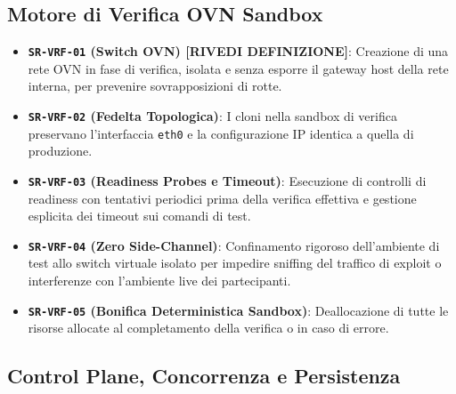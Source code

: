 \subsection{Motore di Verifica OVN
Sandbox}\label{motore-di-verifica-ovn-sandbox}

\begin{itemize}
\tightlist
\item
  \textbf{\passthrough{\lstinline!SR-VRF-01!} (Switch OVN) {[}RIVEDI
  DEFINIZIONE{]}}: Creazione di una rete OVN in fase di verifica,
  isolata e senza esporre il gateway host della rete interna, per
  prevenire sovrapposizioni di rotte.
\item
  \textbf{\passthrough{\lstinline!SR-VRF-02!} (Fedelta Topologica)}: I
  cloni nella sandbox di verifica preservano l'interfaccia
  \passthrough{\lstinline!eth0!} e la configurazione IP identica a
  quella di produzione.
\item
  \textbf{\passthrough{\lstinline!SR-VRF-03!} (Readiness Probes e
  Timeout)}: Esecuzione di controlli di readiness con tentativi
  periodici prima della verifica effettiva e gestione esplicita dei
  timeout sui comandi di test.
\item
  \textbf{\passthrough{\lstinline!SR-VRF-04!} (Zero Side-Channel)}:
  Confinamento rigoroso dell'ambiente di test allo switch virtuale
  isolato per impedire sniffing del traffico di exploit o interferenze
  con l'ambiente live dei partecipanti.
\item
  \textbf{\passthrough{\lstinline!SR-VRF-05!} (Bonifica Deterministica
  Sandbox)}: Deallocazione di tutte le risorse allocate al completamento
  della verifica o in caso di errore.
\end{itemize}

\subsection{Control Plane, Concorrenza e
Persistenza}\label{control-plane-concorrenza-e-persistenza}

